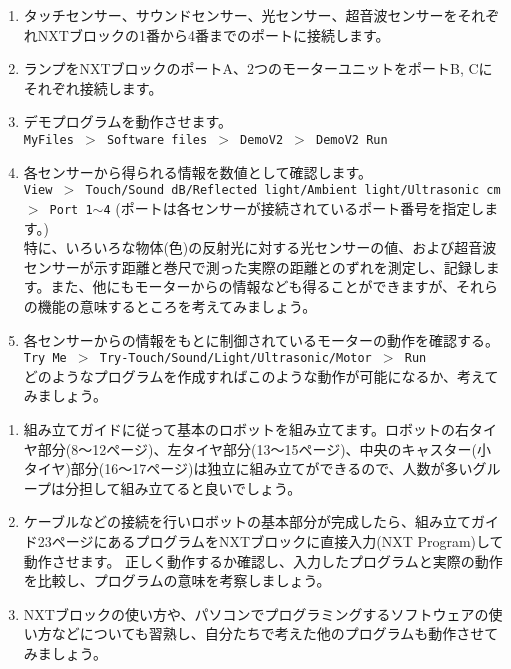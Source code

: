 \bigskip


\begin{enumerate}

\item タッチセンサー、サウンドセンサー、光センサー、超音波センサーをそれぞれNXTブロックの1番から4番までのポートに接続します。

\item ランプをNXTブロックのポートA、2つのモーターユニットをポートB, Cにそれぞれ接続します。

\item デモプログラムを動作させます。\\
{\tt MyFiles $>$ Software files $>$ DemoV2 $>$ DemoV2 Run}

\item 各センサーから得られる情報を数値として確認します。\\
{\tt View $>$ Touch/Sound dB/Reflected light/Ambient light/Ultrasonic cm$>$ Port 1$\sim$4}
(ポートは各センサーが接続されているポート番号を指定します。)\\
特に、いろいろな物体(色)の反射光に対する光センサーの値、および超音波センサーが示す距離と巻尺で測った実際の距離とのずれを測定し、記録します。また、他にもモーターからの情報なども得ることができますが、それらの機能の意味するところを考えてみましょう。

\item 各センサーからの情報をもとに制御されているモーターの動作を確認する。\\
{\tt Try Me $>$ Try-Touch/Sound/Light/Ultrasonic/Motor $>$ Run}\\
どのようなプログラムを作成すればこのような動作が可能になるか、考えてみましょう。




\end{enumerate}


\begin{enumerate}

\item 組み立てガイドに従って基本のロボットを組み立てます。ロボットの右タイヤ部分(8〜12ページ)、左タイヤ部分(13〜15ページ)、中央のキャスター(小タイヤ)部分(16〜17ページ)は独立に組み立てができるので、人数が多いグループは分担して組み立てると良いでしょう。

\item ケーブルなどの接続を行いロボットの基本部分が完成したら、組み立てガイド23ページにあるプログラムをNXTブロックに直接入力(NXT Program)して動作させます。 正しく動作するか確認し、入力したプログラムと実際の動作を比較し、プログラムの意味を考察しましょう。

\item NXTブロックの使い方や、パソコンでプログラミングするソフトウェアの使い方などについても習熟し、自分たちで考えた他のプログラムも動作させてみましょう。

\end{enumerate}


